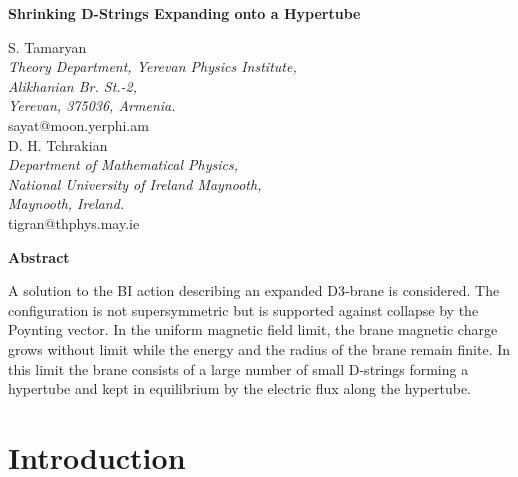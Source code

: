 \documentclass[a4paper,12pt]{article}
\begin{document}
\setlength{\textheight}{9.0in}
\setlength{\topmargin}{-0.6in}
\setlength{\oddsidemargin}{0.15in}
\setlength{\evensidemargin}{0.4in}
\renewcommand{\thefootnote}{\fnsymbol{footnote}}
\providecommand{\e}{{\bf E}}
\providecommand{\m}{{\bf B}}
\providecommand{\h}{{\bf H}}
\renewcommand{\d}{{\bf D}}

\vspace{1cm}

\begin{center}
{\Large {\bf Shrinking D-Strings Expanding onto a Hypertube}}
\vspace{1truecm}

{\large S. Tamaryan}\\
\smallskip
{\it  Theory Department, Yerevan Physics Institute,\\ 
Alikhanian Br. St.-2,\\
Yerevan, 375036, Armenia.}\\
\smallskip
sayat@moon.yerphi.am\\
\vspace{1truecm}
{\large D. H. Tchrakian}\\
\smallskip
{\it Department of Mathematical Physics,\\
National University of Ireland Maynooth,\\
Maynooth, Ireland.}\\
\smallskip
tigran@thphys.may.ie

\end{center}

\vspace{1cm}

{\centerline {\bf Abstract}}

\vspace{0.4cm}

A solution to the BI action describing an expanded D3-brane is considered. The configuration is not supersymmetric but is supported against collapse by the Poynting vector. In the uniform magnetic field limit, the brane magnetic charge grows without limit while the energy and the radius of the brane remain finite. In this limit the brane consists of a large number of small D-strings forming a hypertube and kept in equilibrium by the electric flux along the hypertube.


\newpage
\section{Introduction}
\end{document}
